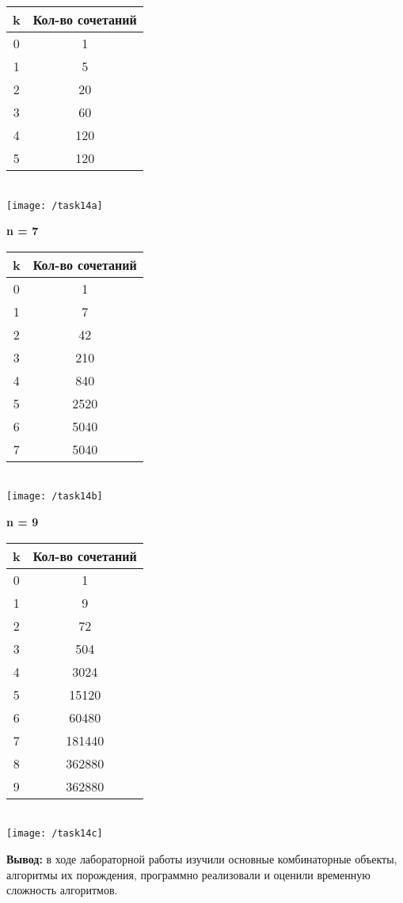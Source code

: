 \documentclass[a4paper,14pt]{extarticle}
\begin{document}
\begin{enumerate}[№1. ]
\begin{center}
\begin{tabular}{c|c}
		\hline
		k&Кол-во сочетаний\\
		\hline
		0&1\\
		\hline
		1&5\\
		\hline
		2&20\\
		\hline
		3&60\\
		\hline
		4&120\\
		\hline
		5&120\\
		\hline
	\end{tabular}\\
	\texttt{[image: /task14a]}\bigbreak
\end{center}

\textbf{n = 7}\\
\begin{center}
	\begin{tabular}{c|c} 
		
		\hline
		k&Кол-во сочетаний\\
		\hline
		0&1\\
		\hline
		1&7\\
		\hline
		2&42\\
		\hline
		3&210\\
		\hline
		4&840\\
		\hline
		5&2520\\
		\hline
		6&5040\\
		\hline
		7&5040\\
		\hline
	\end{tabular}\\
	\texttt{[image: /task14b]}\bigbreak
\end{center}

\textbf{n = 9}\\
\begin{center}
	\begin{tabular}{c|c} 
		
		\hline
		k&Кол-во сочетаний\\
		\hline
		0&1\\
		\hline
		1&9\\
		\hline
		2&72\\
		\hline
		3&504\\
		\hline
		4&3024\\
		\hline
		5&15120\\
		\hline
		6&60480\\
		\hline
		7&181440\\
		\hline
		8&362880\\
		\hline
		9&362880\\
		\hline
	\end{tabular}\\
	\texttt{[image: /task14c]}
\end{center}
\bigbreak
\end{enumerate}
			\textbf{Вывод: } в ходе лабораторной работы изучили основные комбинаторные объекты, алгоритмы их порождения, программно реализовали и оценили временную сложность алгоритмов.
			
\end{document}

